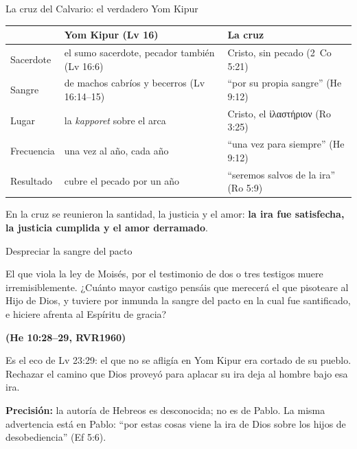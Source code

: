 \documentclass[hyperref={bookmarks=false},aspectratio=169]{beamer}
\newcommand{\grc}[1]{\foreignlanguage{ancientgreek}{#1}}
\newcommand{\fuente}[1]{\par\hfill{\upshape\bfseries\footnotesize\textcolor{azul}{#1}}}
\newcommand{\destacar}[1]{\textbf{\textcolor{azul}{#1}}}
\newcommand{\precision}[1]{{\footnotesize\color{gris}\textbf{Precisión:} #1}}
\begin{document}
\begin{frame}{La cruz del Calvario: el verdadero Yom Kipur}
\scriptsize\renewcommand{\arraystretch}{1.25}
\begin{tabular}{@{}>{\RaggedRight\arraybackslash}p{2.2cm}>{\RaggedRight\arraybackslash}p{4.7cm}>{\RaggedRight\arraybackslash}p{4.9cm}@{}}
\toprule
& \textbf{Yom Kipur (Lv 16)} & \textbf{La cruz} \\ \midrule
Sacerdote & el sumo sacerdote, pecador también (Lv 16:6) & Cristo, sin pecado (2~Co 5:21) \\
Sangre & de machos cabríos y becerros (Lv 16:14--15) & ``por su propia sangre'' (He 9:12) \\
Lugar & la \emph{kapporet} sobre el arca & Cristo, el \grc{ἱλαστήριον} (Ro 3:25) \\
Frecuencia & una vez al año, cada año & ``una vez para siempre'' (He 9:12) \\
Resultado & cubre el pecado por un año & ``seremos salvos de la ira'' (Ro 5:9) \\
\bottomrule
\end{tabular}\par\medskip
\begin{tcolorbox}[colback=papiro,colframe=dorado,boxrule=1.2pt,arc=3pt]
\centering\small En la cruz se reunieron la santidad, la justicia y el amor: \destacar{la ira fue satisfecha, la justicia cumplida y el amor derramado}.
\end{tcolorbox}
\end{frame}

\begin{frame}{Despreciar la sangre del pacto}
\begin{cita}El que viola la ley de Moisés, por el testimonio de dos o tres testigos muere irremisiblemente. ¿Cuánto mayor castigo pensáis que merecerá el que pisoteare al Hijo de Dios, y tuviere por inmunda la sangre del pacto en la cual fue santificado, e hiciere afrenta al Espíritu de gracia?\fuente{(He 10:28--29, RVR1960)}\end{cita}
\small\RaggedRight Es el eco de Lv 23:29: el que no se afligía en Yom Kipur era cortado de su pueblo. Rechazar el camino que Dios proveyó para aplacar su ira deja al hombre bajo esa ira.\par\smallskip
\precision{la autoría de Hebreos es desconocida; no es de Pablo. La misma advertencia está en Pablo: ``por estas cosas viene la ira de Dios sobre los hijos de desobediencia'' (Ef 5:6).}
\end{frame}
\end{document}
